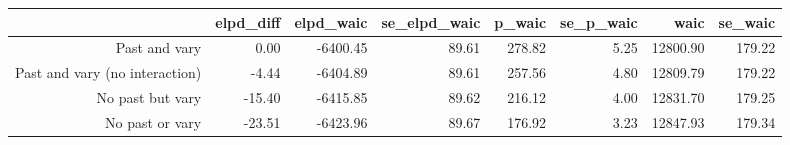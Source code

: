 \begin{table}[ht]
\centering
\begin{tabular}{rrrrrrrr}
  \hline
 & elpd\_diff & elpd\_waic & se\_elpd\_waic & p\_waic & se\_p\_waic & waic & se\_waic \\ 
  \hline
Past and vary & 0.00 & -6400.45 & 89.61 & 278.82 & 5.25 & 12800.90 & 179.22 \\ 
  Past and vary (no interaction) & -4.44 & -6404.89 & 89.61 & 257.56 & 4.80 & 12809.79 & 179.22 \\ 
  No past but vary & -15.40 & -6415.85 & 89.62 & 216.12 & 4.00 & 12831.70 & 179.25 \\ 
  No past or vary & -23.51 & -6423.96 & 89.67 & 176.92 & 3.23 & 12847.93 & 179.34 \\ 
   \hline
\end{tabular}
\end{table}

